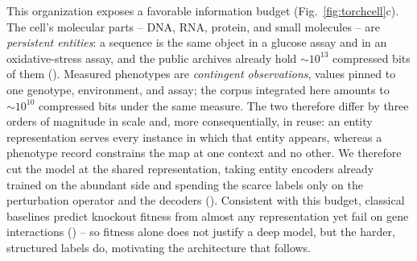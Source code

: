 This organization exposes a favorable information budget (Fig.~\ref{fig:torchcell}c). The
cell's molecular parts -- DNA, RNA, protein, and small molecules -- are \emph{persistent
entities}: a sequence is the same object in a glucose assay and in an oxidative-stress
assay, and the public archives already hold ${\sim}10^{13}$ compressed bits of them
(). Measured phenotypes are \emph{contingent
observations}, values pinned to one genotype, environment, and assay; the corpus integrated
here amounts to ${\sim}10^{10}$ compressed bits under the same measure. The two therefore
differ by three orders of magnitude in scale and, more consequentially, in reuse: an entity
representation serves every instance in which that entity appears, whereas a phenotype
record constrains the map at one context and no other. We therefore cut the model at the
shared representation, taking entity encoders already trained on the abundant side and
spending the scarce labels only on the perturbation operator and the decoders
(). Consistent with this budget, classical baselines predict knockout
fitness from almost any representation yet fail on gene interactions () -- so fitness alone does not justify a deep model, but the
harder, structured labels do, motivating the architecture that follows.

